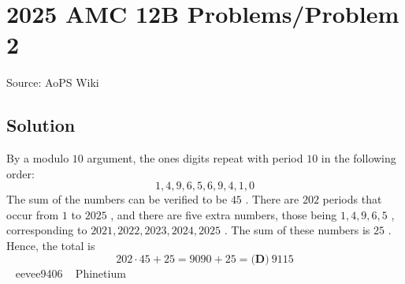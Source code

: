 \documentclass[12pt]{article}
\begin{document}
\section*{{2025 AMC 12B Problems/Problem 2}}
Source: AoPS Wiki

\subsection*{Solution}
By a modulo $10$ argument, the ones digits repeat with period $10$ in the following order: \[1,4,9,6,5,6,9,4,1,0\] The sum of the numbers can be verified to be $45$ . There are $202$ periods that occur from $1$ to $2025$ , and there are five extra numbers, those being $1,4,9,6,5$ , corresponding to $2021,2022,2023,2024,2025$ . The sum of these numbers is $25$ . Hence, the total is \[202\cdot 45+25=9090+25=\boxed{\textbf{(D)}~9115}\] ~ eevee9406 ~ Phinetium
\end{document}
